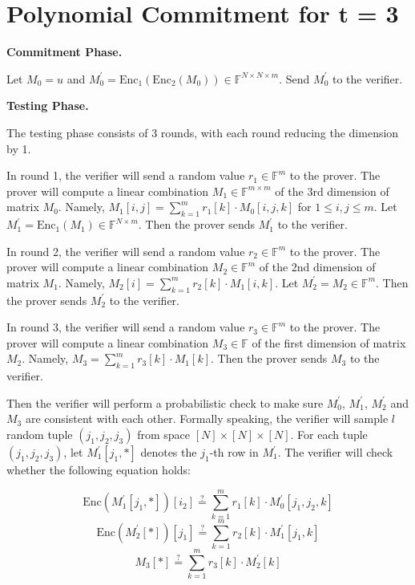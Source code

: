 \section{Polynomial Commitment for t = 3}

\textbf{Commitment Phase.}

Let $M_0 = u$ and $M_0^{\prime} = \text{Enc}_1(\text{Enc}_2(M_0)) \in \mathbb{F}^{N \times N \times m}$. Send $M_0^{\prime}$ to the verifier.

\textbf{Testing Phase.}

The testing phase consists of $3$ rounds, with each round reducing the dimension by 1.

In round 1, the verifier will send a random value $r_1 \in \mathbb{F}^m$ to the prover.
The prover will compute a linear combination $M_1 \in \mathbb{F}^{m \times m}$ of the 3rd dimension of matrix $M_0$.
Namely, $M_1[i,j] = \sum_{k=1}^{m} r_1[k] \cdot M_0[i,j,k]$ for $1 \le i, j \le m$. 
Let $M_1^\prime = \text{Enc}_1(M_1) \in \mathbb{F}^{N \times m}$.
Then the prover sends $M_1^\prime$ to the verifier.

In round 2, the verifier will send a random value $r_2 \in \mathbb{F}^m$ to the prover.
The prover will compute a linear combination $M_2 \in \mathbb{F}^{m}$ of the 2nd dimension of matrix $M_1$.
Namely, $M_2[i] = \sum_{k=1}^{m} r_2[k] \cdot M_1[i, k]$. 
Let $M_2^\prime = M_2 \in \mathbb{F}^{m}$.
Then the prover sends $M_2^\prime$ to the verifier.

In round 3, the verifier will send a random value $r_3 \in \mathbb{F}^m$ to the prover.
The prover will compute a linear combination $M_3 \in \mathbb{F}$ of the first dimension of matrix $M_2$.
Namely, $M_3 = \sum_{k=1}^{m} r_3[k] \cdot M_1[k]$. 
Then the prover sends $M_3$ to the verifier.

Then the verifier will perform a probabilistic check to make sure $M_0^\prime $, $ M_1^\prime$, $M_2^\prime$ and $M_3$ are consistent with each other. Formally speaking, the verifier will sample $l$ random tuple $(j_1, j_2, j_3)$ from space $[N] \times [N] \times [N]$. 
For each tuple $(j_1, j_2, j_3)$, let $M_1^\prime[j_1, *]$ denotes the $j_1$-th row in $M_1^\prime$.
The verifier will check whether the following equation holds:

$$
    \text{Enc}(M_1^\prime[j_1, *])[i_2] \stackrel{?}{=} \sum_{k=1}^m r_1[k] \cdot M_0^{\prime}[j_1,j_2,k]
$$
$$
    \text{Enc}(M_2^\prime[*])[j_1] \stackrel{?}{=} \sum_{k=1}^m r_2[k] \cdot M_1^{\prime}[j_1,k]
$$
$$
    M_3[*] \stackrel{?}{=} \sum_{k=1}^m r_3[k] \cdot M_2^{\prime}[k]
$$

